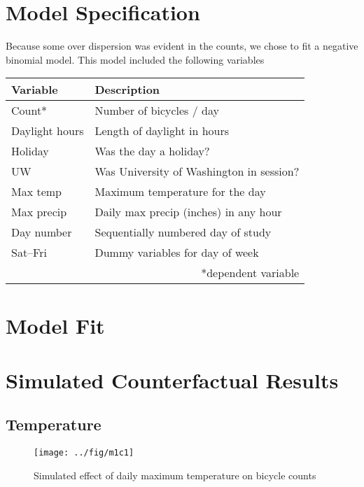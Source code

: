 \documentclass[final]{beamer}
\begin{document}
\begin{frame}[t]
\begin{multicols}{3}
\section{Model Specification}
Because some over dispersion was evident in the counts, we chose to
fit a negative binomial model. This model included the following variables

\begin{table}[htdp]
\begin{center}
\begin{tabular}{ll}
  \hline\hline
  Variable & Description \\
  \hline
  Count* & Number of bicycles / day \\
  Daylight hours & Length of daylight in hours \\
  Holiday & Was the day a holiday? \\
  UW & Was University of Washington in session? \\
  Max temp & Maximum temperature for the day \\
  Max precip & Daily max precip (inches) in any hour \\
  Day number & Sequentially numbered day of study \\
  Sat--Fri & Dummy variables for day of week \\
  \hline\hline
    & \multicolumn{1}{r}{*dependent variable}
\end{tabular}
\end{center}
\label{default}
\end{table}%

\section{Model Fit}

\section{Simulated Counterfactual Results}

\subsection{Temperature}

\begin{figure}[htbp]
\begin{center}
\texttt{[image: ../fig/m1c1]}
\caption{Simulated effect of daily maximum temperature on bicycle counts}
\label{fg:temp}
\end{center}
\end{figure}



\end{multicols}
\end{frame}
\end{document}
